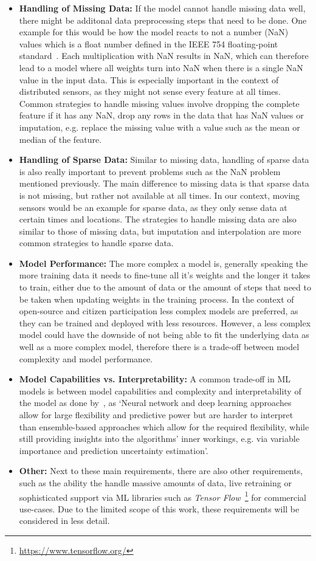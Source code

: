 \begin{itemize}
    \item \textbf{Handling of Missing Data:} If the model cannot handle missing data well, there might be additonal data preprocessing steps that need to be done. One example for this would be how the model reacts to not a number (NaN) values which is a float number defined in the IEEE 754 floating-point standard~\cite{ieee754}. Each multiplication with NaN results in NaN, which can therefore lead to a model where all weights turn into NaN when there is a single NaN value in the input data. This is especially important in the context of distributed sensors, as they might not sense every feature at all times. Common strategies to handle missing values involve dropping the complete feature if it has any NaN, drop any rows in the data that has NaN values or imputation, e.g. replace the missing value with a value such as the mean or median of the feature.
    \item \textbf{Handling of Sparse Data:} Similar to missing data, handling of sparse data is also really important to prevent problems such as the NaN problem mentioned previously. The main difference to missing data is that sparse data is not missing, but rather not available at all times. In our context, moving sensors would be an example for sparse data, as they only sense data at certain times and locations. The strategies to handle missing data are also similar to those of missing data, but imputation and interpolation are more common strategies to handle sparse data.
    \item \textbf{Model Performance:} The more complex a model is, generally speaking the more training data it needs to fine-tune all it's weights and the longer it takes to train, either due to the amount of data or the amount of steps that need to be taken when updating weights in the training process. In the context of open-source and citizen participation less complex models are preferred, as they can be trained and deployed with less resources. However, a less complex model could have the downside of not being able to fit the underlying data as well as a more complex model, therefore there is a trade-off between model complexity and model performance.
    \item \textbf{Model Capabilities vs. Interpretability:} A common trade-off in ML models is between model capabilities and complexity and interpretability of the model as done by~\cite{zumwald2021mapping}, as `Neural network and deep learning approaches allow for large flexibility and predictive power but are harder to interpret than ensemble-based approaches which allow for the required flexibility, while still providing insights into the algorithms' inner workings, e.g. via variable importance and prediction uncertainty estimation'.
    \item \textbf{Other:} Next to these main requirements, there are also other requirements, such as the ability the handle massive amounts of data, live retraining or sophisticated support via ML libraries such as \textit{Tensor Flow}~\footnote{\url{https://www.tensorflow.org/}} for commercial use-cases. Due to the limited scope of this work, these requirements will be considered in less detail.
\end{itemize}

